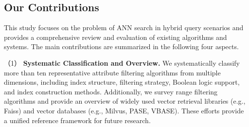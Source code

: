 \documentclass[sigconf, nonacm]{acmart}
\begin{document}
\begin{sloppypar}

\subsection{Our Contributions}
This study focuses on the problem of ANN search in hybrid query scenarios and provides a comprehensive review and evaluation of existing algorithms and systems. The main contributions are summarized in the following four aspects.

（1）\textbf{ Systematic Classification and Overview.}
We systematically classify more than ten representative attribute filtering algorithms from multiple dimensions, including index structure, filtering strategy, Boolean logic support, and index construction methods. Additionally, we survey range filtering algorithms and provide an overview of widely used vector retrieval libraries (e.g., Faiss) and vector databases (e.g., Milvus, PASE, VBASE). These efforts provide a unified reference framework for future research.


\end{sloppypar}
\end{document}
